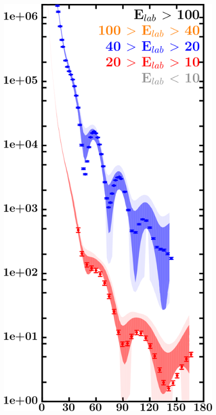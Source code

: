 \documentclass[twocolumn,secnumarabic,amssymb, nobibnotes, aps, prl,
superscriptaddress, nobalancelastpage]{revtex4}
\begin{document}
\begin{figure}[!htb]
    \centering
    \begin{minipage}{0.4\linewidth}
        \centering
        \includegraphics[width=\linewidth]{figures/sn112_protonElastic.png}
        \label{DOM_sn112_proton_elastic}
    \end{minipage}\hspace{6pt}

\end{figure}
\end{document}

